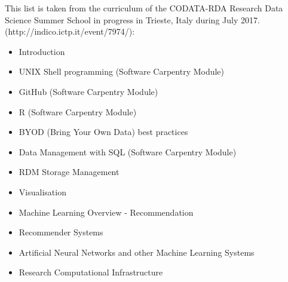 \documentclass[12pt,a4paper]{article}
\begin{document}
\begin{appendices}
This list is taken from the curriculum of the CODATA-RDA Research Data
Science Summer School in progress in Trieste, Italy during July 2017.
(http://indico.ictp.it/event/7974/):

\begin{itemize}
\item Introduction
\item UNIX Shell programming (Software Carpentry Module)
\item GitHub (Software Carpentry Module)
\item R (Software Carpentry Module)
\item BYOD (Bring Your Own Data) best practices
\item Data Management with SQL  (Software Carpentry Module)
\item RDM Storage Management
\item Visualisation
\item Machine Learning Overview - Recommendation
\item Recommender Systems
\item Artificial Neural Networks and other Machine Learning Systems 
\item Research Computational Infrastructure 
\end{itemize}

\end{appendices}

\sloppy
\raggedright
\clearpage
\printbibliography[title={References},heading=bibintoc]
\end{document}
